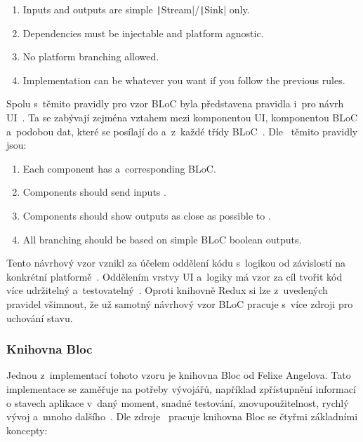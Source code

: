 \begin{enumerate}
    \item Inputs and outputs are simple
    \texttt|Stream|/\texttt|Sink| only.
    \item Dependencies must be injectable and platform agnostic.
    \item No platform branching allowed.
    \item Implementation can be whatever you want
    if you follow the previous rules.
\end{enumerate}

Spolu s~těmito pravidly pro vzor BLoC byla představena
pravidla i~pro návrh UI~\cite{googledevelopers_bloc}.
Ta se zabývají zejména vztahem mezi komponentou UI, komponentou BLoC
a~podobou dat,
které se posílají do a~z~každé třídy BLoC~\cite{googledevelopers_bloc}.
Dle~\cite{googledevelopers_bloc} těmito pravidly jsou:

\begin{enumerate}
    \item Each  component has a~corresponding BLoC.
    \item Components should send inputs .
    \item Components should show outputs as close as possible to .
    \item All branching should be based on simple BLoC boolean outputs.
\end{enumerate}

Tento návrhový vzor vznikl za účelem oddělení kódu s~logikou
od závislostí na konkrétní platformě~\cite{googledevelopers_bloc}.
Oddělením vrstvy UI a~logiky má vzor za cíl tvořit kód více udržitelný
a~testovatelný~\cite{flutterando_analyzing_bloc_mobx}.
Oproti knihovně Redux si lze z~uvedených pravidel všimnout,
že už samotný návrhový vzor BLoC pracuje s~více zdroji pro uchování stavu.

\subsubsection{Knihovna Bloc}

Jednou z~implementací tohoto vzoru je knihovna Bloc od Felixe
Angelova.
Tato implementace se zaměřuje na potřeby vývojářů,
například zpřístupnění informací o stavech aplikace v~daný moment,
snadné testování, znovupoužitelnost, rychlý vývoj a~mnoho dalšího~\cite{bloclibrary_whybloc}. 
Dle zdroje~\cite{bloclibrary_coreconcepts} pracuje knihovna Bloc se čtyřmi
základními koncepty: 

